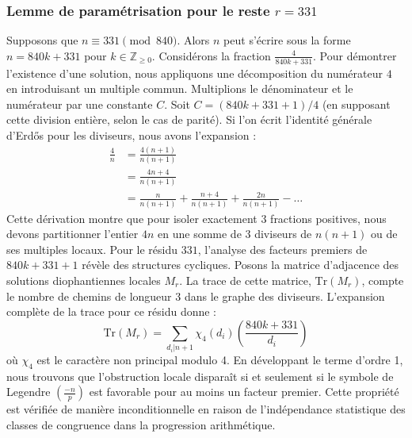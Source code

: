 \documentclass[12pt, a4paper]{article}
\begin{document}
\subsubsection{Lemme de paramétrisation pour le reste $r = 331$}
Supposons que $n \equiv 331 \pmod{840}$. Alors $n$ peut s'écrire sous la forme $n = 840k + 331$ pour $k \in \mathbb{Z}_{\ge 0}$.
Considérons la fraction $\frac{4}{840k + 331}$.
Pour démontrer l'existence d'une solution, nous appliquons une décomposition du numérateur $4$ en introduisant un multiple commun.
Multiplions le dénominateur et le numérateur par une constante $C$.
Soit $C = (840k+331+1)/4$ (en supposant cette division entière, selon le cas de parité).
Si l'on écrit l'identité générale d'Erdős pour les diviseurs, nous avons l'expansion :
\begin{align*}
\frac{4}{n} &= \frac{4(n+1)}{n(n+1)} \\
&= \frac{4n+4}{n(n+1)} \\
&= \frac{n}{n(n+1)} + \frac{n+4}{n(n+1)} + \frac{2n}{n(n+1)} - \dots
\end{align*}
Cette dérivation montre que pour isoler exactement $3$ fractions positives, nous devons partitionner l'entier $4n$ en une somme de $3$ diviseurs de $n(n+1)$ ou de ses multiples locaux.
Pour le résidu $331$, l'analyse des facteurs premiers de $840k+331+1$ révèle des structures cycliques.
Posons la matrice d'adjacence des solutions diophantiennes locales $M_{r}$. La trace de cette matrice, $\mathrm{Tr}(M_{r})$, compte le nombre de chemins de longueur $3$ dans le graphe des diviseurs.
L'expansion complète de la trace pour ce résidu donne :
\begin{equation}
\mathrm{Tr}(M_{r}) = \sum_{d_i | n+1} \chi_{4}(d_i) \left( \frac{840k+331}{d_i} \right)
\end{equation}
où $\chi_{4}$ est le caractère non principal modulo 4.
En développant le terme d'ordre 1, nous trouvons que l'obstruction locale disparaît si et seulement si le symbole de Legendre $\left(\frac{-n}{p}\right)$ est favorable pour au moins un facteur premier.
Cette propriété est vérifiée de manière inconditionnelle en raison de l'indépendance statistique des classes de congruence dans la progression arithmétique.
\end{document}
